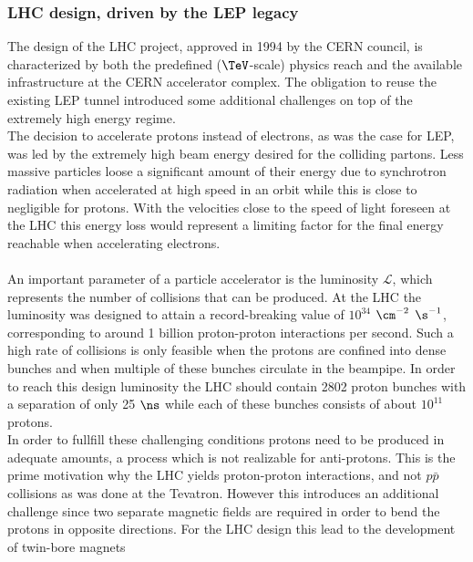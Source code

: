 \subsubsection{LHC design, driven by the LEP legacy}
The design of the LHC project, approved in 1994 by the CERN council, is characterized by both the predefined ($\TeV$-scale) physics reach and the available infrastructure at the CERN accelerator complex.
The obligation to reuse the existing LEP tunnel introduced some additional challenges on top of the extremely high energy regime. 
\\
The decision to accelerate protons instead of electrons, as was the case for LEP, was led by the extremely high beam energy desired for the colliding partons. Less massive particles loose a significant amount of their energy due to synchrotron radiation when accelerated at high speed in an orbit while this is close to negligible for protons. With the velocities close to the speed of light foreseen at the LHC this energy loss would represent a limiting factor for the final energy reachable when accelerating electrons.
\\
\\
An important parameter of a particle accelerator is the luminosity $\mathcal{L}$, which represents the number of collisions that can be produced.
At the LHC the luminosity was designed to attain a record-breaking value of $10^{34}$ $\cm^{-2}$ $\s^{-1}$, corresponding to around 1 billion proton-proton interactions per second. Such a high rate of collisions is only feasible when the protons are confined into dense bunches and when multiple of these bunches circulate in the beampipe.
In order to reach this design luminosity the LHC should contain 2802 proton bunches with a separation of only 25 $\ns$ while each of these bunches consists of about $10^{11}$ protons.
\\
In order to fullfill these challenging conditions protons need to be produced in adequate amounts, a process which is not realizable for anti-protons. This is the prime motivation why the LHC yields proton-proton interactions, and not $p\bar{p}$ collisions as was done at the Tevatron.
However this introduces an additional challenge since two separate magnetic fields are required in order to bend the protons in opposite directions. For the LHC design this lead to the development of twin-bore magnets 
\\

